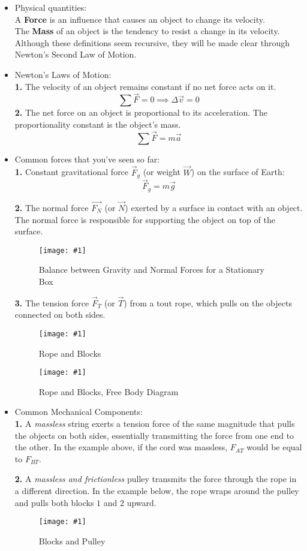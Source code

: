 \documentclass[11pt]{article}
\newcommand{\fig}[4]{
    \begin{figure}[H]
        \centering
        \texttt{[image: \#1]}
        \caption{#2}
        \label{exp4fit}
    \end{figure}
}
\theoremstyle{gangnamstyle}{\newtheorem{definition}{Definition}[]}
\theoremstyle{gangnamstyle}{\newtheorem{example}{Example}[]}
\theoremstyle{gangnamstyle}{\newtheorem{problem}{Problem}[]}
\begin{document}
\begin{itemize}
\item Physical quantities: \\
A \textbf{Force} is an influence that causes an object to change its velocity. \\
The \textbf{Mass} of an object is the tendency to resist a change in its velocity. \\
Although these definitions seem recursive, they will be made clear through Newton's Second Law of Motion. 

\item Newton's Laws of Motion: \\
\textbf{1.} The velocity of an object remains constant if no net force acts on it. 
\[ \sum \Vec{F} = 0 \implies \Delta \Vec{v} = 0 \]
\textbf{2.} The net force on an object is proportional to its acceleration. The proportionality constant is the object's mass. 
\[ \sum \Vec{F} = m\Vec{a} \]

\item Common forces that you've seen so far: \\
\textbf{1.} Constant gravitational force $\Vec{F}_g$ (or weight $\Vec{W}$) on the surface of Earth: 
\[ \Vec{F}_g = m\Vec{g} \]


\textbf{2.} The normal force $\Vec{F_N}$ (or $\Vec{N}$) exerted by a surface in contact with an object. The normal force is responsible for supporting the object on top of the surface. 

\fig{figs/0625/normal.png}{Balance between Gravity and Normal Forces for a Stationary Box}{0.65}{0}

\textbf{3.} The tension force $\Vec{F}_T$ (or $\Vec{T}$) from a tout rope, which pulls on the objects connected on both sides. 
\fig{figs/0625/pull.png}{Rope and Blocks}{0.5}{0}
\fig{figs/0625/pullfbd.png}{Rope and Blocks, Free Body Diagram}{0.5}{0}


\item Common Mechanical Components: \\
\textbf{1.} A \textit{massless} string exerts a tension force of the same magnitude that pulls the objects on both sides, essentially transmitting the force from one end to the other. In the example above, if the cord was massless, $F_{AT}$ would be equal to $F_{BT}$. 

\textbf{2.} A \textit{massless and frictionless} pulley transmits the force through the rope in a different direction. In the example below, the rope wraps around the pulley and pulls both blocks $1$ and $2$ upward. 
\fig{figs/0625/pulley.png}{Blocks and Pulley}{0.6}{0}


\end{itemize}
\end{document}
